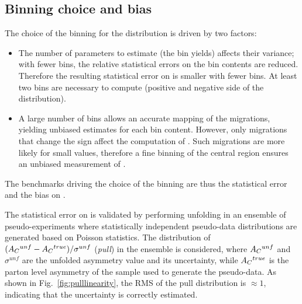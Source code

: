 \subsection{Binning choice and bias}

The choice of the binning for the \dy{} distribution is driven by two
factors:
\begin{itemize}
\item The number of parameters to estimate (the \dy{} bin yields)
  affects their variance; with fewer bins, the relative statistical
  errors on the bin contents are reduced. Therefore the resulting
  statistical error on \ac{} is smaller with fewer bins. At least two
  bins are necessary to compute \ac{} (positive and negative side of
  the \dy{} distribution).
\item A large number of bins allows an accurate mapping of the
  migrations, yielding unbiased estimates for each bin
  content. However, only migrations that change the \dy{} sign affect
  the computation of \ac{}. Such migrations are more likely for small
  \dy{} values, therefore a fine binning of the central \dy{} region
  ensures an unbiased measurement of \ac{}. 
\end{itemize}
The benchmarks driving the choice of the binning are thus the
statistical error and the bias on \ac{}.

The statistical error on \ac{} is validated by performing unfolding in
an ensemble of pseudo-experiments where statistically independent
pseudo-data distributions are generated based on Poisson statistics.  
The distribution of $(A_C{}^{unf}-A_C{}^{true})/\sigma^{unf}$
({\it pull}) in the ensemble is considered, where $A_C{}^{unf}$ and
$\sigma^{unf}$ are the unfolded asymmetry value and its uncertainty,
while $A_C{}^{true}$ is the parton level asymmetry of the sample used
to generate the pseudo-data. As shown in Fig.~\ref{fig:pulllinearity}, the
RMS of the pull distribution is $\approx{}1$, indicating that the
uncertainty is correctly estimated.  

